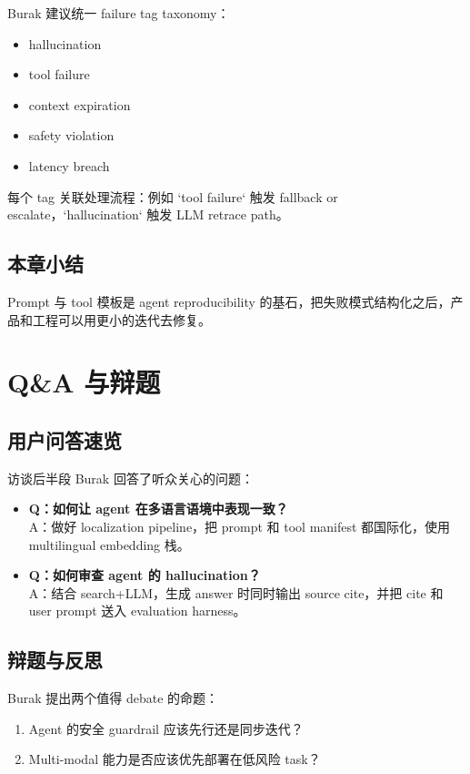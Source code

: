 \documentclass[a4paper]{article}
\begin{document}
Burak 建议统一 failure tag taxonomy：

\begin{itemize}
    \item hallucination
    \item tool failure
    \item context expiration
    \item safety violation
    \item latency breach
\end{itemize}

每个 tag 关联处理流程：例如 `tool failure` 触发 fallback or escalate，`hallucination` 触发 LLM retrace path。

\subsection{本章小结}

Prompt 与 tool 模板是 agent reproducibility 的基石，把失败模式结构化之后，产品和工程可以用更小的迭代去修复。

\section{Q\&A 与辩题}

\subsection{用户问答速览}

访谈后半段 Burak 回答了听众关心的问题：

\begin{itemize}
    \item \textbf{Q：如何让 agent 在多语言语境中表现一致？}\\
    A：做好 localization pipeline，把 prompt 和 tool manifest 都国际化，使用 multilingual embedding 栈。
    \item \textbf{Q：如何审查 agent 的 hallucination？}\\
    A：结合 search+LLM，生成 answer 时同时输出 source cite，并把 cite 和 user prompt 送入 evaluation harness。
\end{itemize}

\subsection{辩题与反思}

Burak 提出两个值得 debate 的命题：

\begin{enumerate}
    \item Agent 的安全 guardrail 应该先行还是同步迭代？
    \item Multi-modal 能力是否应该优先部署在低风险 task？
\end{enumerate}
\end{document}

